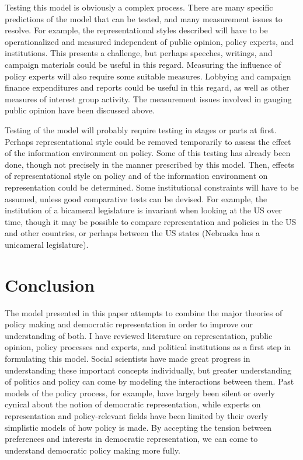 Testing this model is obviously a complex process. There are many specific predictions of the model that can be tested, and many measurement issues to resolve. For example, the representational styles described will have to be operationalized and measured independent of public opinion, policy experts, and institutions. This presents a challenge, but perhaps speeches, writings, and campaign materials could be useful in this regard. Measuring the influence of policy experts will also require some suitable measures. Lobbying and campaign finance expenditures and reports could be useful in this regard, as well as other measures of interest group activity. The measurement issues involved in gauging public opinion have been discussed above.

Testing of the model will probably require testing in stages or parts at first. Perhaps representational style could be removed temporarily to assess the effect of the information environment on policy. Some of this testing has already been done, though not precisely in the manner prescribed by this model. Then, effects of representational style on policy and of the information environment on representation could be determined. Some institutional constraints will have to be assumed, unless good comparative tests can be devised. For example, the institution of a bicameral legislature is invariant when looking at the US over time, though it may be possible to compare representation and policies in the US and other countries, or perhaps between the US states (Nebraska has a unicameral legislature).

\section*{Conclusion}

The model presented in this paper attempts to combine the major theories of policy making and democratic representation in order to improve our understanding of both. I have reviewed literature on representation, public opinion, policy processes and experts, and political institutions as a first step in formulating this model. Social scientists have made great progress in understanding these important concepts individually, but greater understanding of politics and policy can come by modeling the interactions between them. Past models of the policy process, for example, have largely been silent or overly cynical about the notion of democratic representation, while experts on representation and policy-relevant fields have been limited by their overly simplistic models of how policy is made. By accepting the tension between preferences and interests in democratic representation, we can come to understand democratic policy making more fully.

\singlespacing




